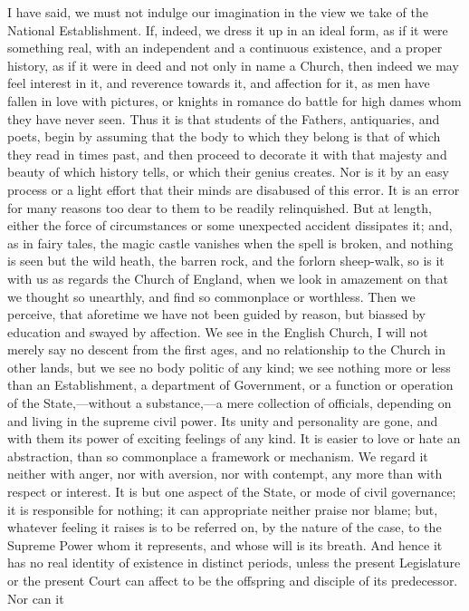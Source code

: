 I have said, we must not indulge our imagination in the view we
take of the National Establishment. If, indeed, we dress it up in an
ideal form, as if it were something real, with an independent and a
continuous existence, and a proper history, as if it were in deed and
not only in name a Church, then indeed we may feel interest in it, and
reverence towards it, and affection for it, as men have fallen in love
with pictures, or knights in romance do battle for high dames whom
they have never seen. Thus it is that students of the Fathers,
antiquaries, and poets, begin by assuming that the body to which they
belong is that of which they read in times past, and then proceed to
decorate it with that majesty and beauty of which history tells, or
which their genius creates. Nor is it by an easy process or a light
effort that their minds are disabused of this error. It is an error
for many reasons too dear to them to be readily relinquished. But at
length, either the force of circumstances or some unexpected accident
dissipates it; and, as in fairy tales, the magic castle vanishes when
the spell is broken, and nothing is seen but the wild heath, the
barren rock, and the forlorn sheep-walk, so is it with us as regards
the Church of England, when we look in amazement on that we thought so
unearthly, and find so commonplace or worthless. Then we perceive,
that aforetime we have not been guided by reason, but biassed by
education and swayed by affection. We see in the English Church, I
will not merely say no descent from the first ages, and no
relationship to the Church in other lands, but we see no body politic
of any kind; we see nothing more or less than an Establishment, a
department of Government, or a function or operation of the State,—without
a substance,—a mere collection of officials, depending on and living
in the supreme civil power. Its unity and personality are gone, and
with them its power of exciting feelings of any kind. It is easier to
love or hate an abstraction, than so commonplace a framework or
mechanism. We regard it neither with anger, nor with aversion, nor
with contempt, any more than with respect or interest. It is but one
aspect of the State, or mode of civil governance; it is responsible
for nothing; it can appropriate neither praise nor blame; but,
whatever feeling it raises is to be referred on, by the nature of the
case, to the Supreme Power whom it represents, and whose will is its
breath. And hence it has no real identity of existence in distinct
periods, unless the present Legislature or the present Court can
affect to be the offspring and disciple of its predecessor. Nor can it
